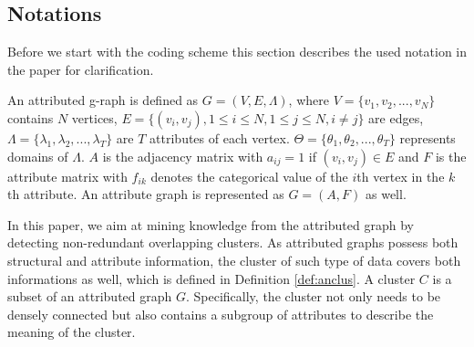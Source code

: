 \subsection{Notations}

Before we start with the coding scheme this section describes the used notation in the paper for clarification.

\begin{definition}\label{def:an}
An attributed g-raph is defined as $G=(V,E,\Lambda)$, where $V = \{v_1, v_2,...,v_N \}$ contains $N$ vertices, $E= \{(v_i,v_j),1\leq i\leq N,1\leq j \leq N,i\neq j \}$ are edges, $\Lambda = \{\lambda_1,\lambda_2,...,\lambda_T \}$ are $T$ attributes of each vertex. $\Theta = \{\theta_1,\theta_2,...,\theta_T \}$ represents domains of $\Lambda$. $A$ is the adjacency matrix with $a_{ij}=1$ if $(v_i,v_j)\in E$ and $F$ is the attribute matrix with $f_{ik}$ denotes the categorical value of the $i$th vertex in the $k$th attribute. An attribute graph is represented as $G=(A,F)$ as well.
\end{definition}

In this paper, we aim at mining knowledge from the attributed graph by detecting non-redundant overlapping clusters. As attributed graphs possess both structural and attribute information, the cluster of such type of data covers both informations as well, which is defined in Definition \ref{def:anclus}. A cluster $C$ is a subset of an attributed graph $G$. Specifically, the cluster not only needs to be densely connected but also contains a subgroup of attributes to describe the meaning of the cluster. 
                                                            
